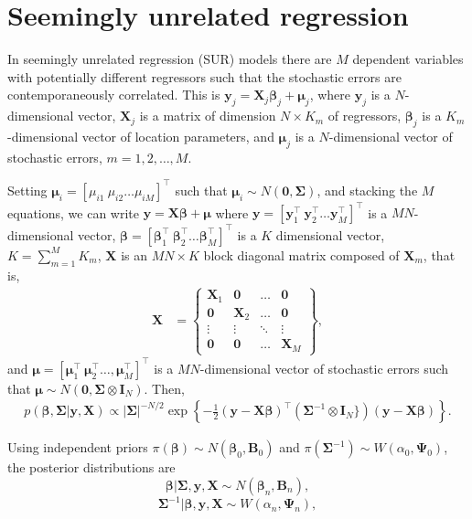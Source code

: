 \section{Seemingly unrelated regression}\label{sec72}

In seemingly unrelated regression (SUR) models there are $M$ dependent variables with potentially different regressors such that the stochastic errors are contemporaneously correlated. This is $\bm{y}_{j}=\bm{X}_{j}\bm{\beta}_j+\bm{\mu}_{j}$, where $\bm{y}_j$ is a $N$-dimensional vector, $\bm{X}_j$ is a matrix of dimension $N\times K_m$ of regressors, $\bm{\beta}_j$ is a $K_m$-dimensional vector of location parameters, and $\bm{\mu}_j$ is a $N$-dimensional vector of stochastic errors, $m=1,2,\dots,M$.
	
Setting $\bm{\mu}_i=\left[\mu_{i1} \ \mu_{i2} \dots \mu_{iM}\right]^{\top}$ such that $\bm{\mu}_i\sim{N}(\bm{0},\bm{\Sigma})$, and stacking the $M$ equations, we can write $\bm{y}=\bm{X}\bm{\beta}+\bm{\mu}$ where $\bm{y}=\left[\bm{y}_{1}^{\top} \ \bm{y}_{2}^{\top} \dots \bm{y}_{M}^{\top}\right]^{\top}$ is a $MN$-dimensional vector,  $\bm{\beta}=\left[\bm{\beta}_{1}^{\top} \ \bm{\beta}_{2}^{\top} \ldots \bm{\beta}_{M}^{\top}\right]^{\top}$ is a $ K$ dimensional vector, $K=\sum_{m=1}^{M} K_m$, $\bm{X}$ is an $MN\times K$ block diagonal matrix composed of $\bm{X}_{m}$, that is,
\begin{align*}
	\bm{X}&=\begin{Bmatrix}
		\bm{X}_1 & \bm{0} & \dots & \bm{0}\\
		\bm{0} & \bm{X}_2 & \dots & \bm{0}\\
		\vdots & \vdots & \ddots & \vdots\\
		\bm{0} & \bm{0} & \dots & \bm{X}_M		
	\end{Bmatrix},
\end{align*}
and $\bm{\mu}=\left[\bm{\mu}_{1}^{\top} \ \bm{\mu}_{2}^{\top} \dots ,\bm{\mu}_{M}^{\top}\right]^{\top}$ is a $MN$-dimensional vector of stochastic errors such that $\bm{\mu}\sim{N}(\bm{0},\bm{\Sigma}\otimes \bm{I}_N)$.
Then, 
\begin{align*}
	p(\bm{\beta},\bm{\Sigma}|\bm{y},\bm{X})\propto \left|\bm{\Sigma} \right|^{-N/2}\exp\left\{ -\frac{1}{2}(\bm{y}-\bm{X\beta})^{\top}(\bm{\Sigma}^{-1}\otimes \bm{I}_N\})(\bm{y}-\bm{X\beta})\right\}.
\end{align*}

Using independent priors $\pi(\bm{\beta})\sim{N}(\bm{\beta}_0,\bm{B}_0)$ and $\pi(\bm{\Sigma}^{-1})\sim{W}(\alpha_0,\bm{\Psi}_0)$, the posterior distributions are
\begin{equation*}
	\bm{\beta}|\bm{\Sigma}, \bm{y}, \bm{X} \sim {N}(\bm{\beta}_n, \bm{B}_n), 
\end{equation*}
\begin{equation*}
	\bm{\Sigma}^{-1}|\bm{\beta}, \bm{y}, \bm{X} \sim {W}(\alpha_n, \bm{\Psi}_n),
\end{equation*}

